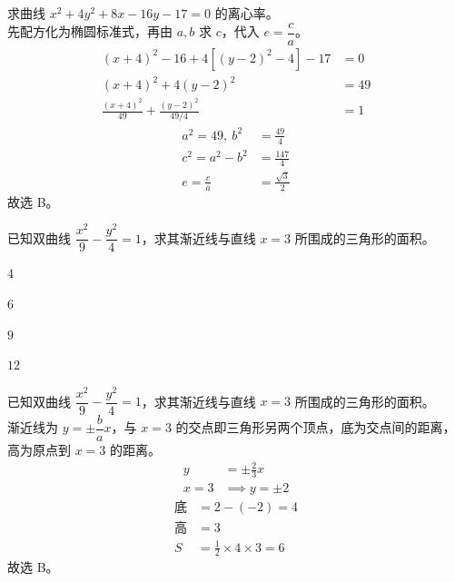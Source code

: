 \documentclass[12pt,a4paper]{exam-zh}
\begin{document}
\begin{solution}
    求曲线 $x^2+4y^2+8x-16y-17=0$ 的离心率。 \\
    先配方化为椭圆标准式，再由 $a,b$ 求 $c$，代入 $e=\dfrac{c}{a}$。 \\
    \begin{align*}
        (x+4)^2-16+4\left[(y-2)^2-4\right]-17 &= 0 \\
        (x+4)^2+4(y-2)^2 &= 49 \\
        \frac{(x+4)^2}{49}+\frac{(y-2)^2}{49/4} &= 1
    \end{align*}
    \begin{align*}
        a^2=49,\ b^2 &= \frac{49}{4} \\
        c^2 = a^2-b^2 &= \frac{147}{4} \\
        e=\frac{c}{a} &= \frac{\sqrt3}{2}
    \end{align*}
    故选 B。
\end{solution}



\begin{question}
    已知双曲线 $\dfrac{x^2}{9}-\dfrac{y^2}{4}=1$，求其渐近线与直线 $x=3$ 所围成的三角形的面积。 \paren[2]
    \begin{choices}
        \item $4$
        \item $6$
        \item $9$
        \item $12$
    \end{choices}
\end{question}

\begin{solution}
    已知双曲线 $\dfrac{x^2}{9}-\dfrac{y^2}{4}=1$，求其渐近线与直线 $x=3$ 所围成的三角形的面积。 \\
    渐近线为 $y=\pm\dfrac{b}{a}x$，与 $x=3$ 的交点即三角形另两个顶点，底为交点间的距离，高为原点到 $x=3$ 的距离。 \\
    \begin{align*}
        y &= \pm\frac{2}{3}x \\
        x=3 &\implies y=\pm2
    \end{align*}
    \begin{align*}
        \text{底} &= 2-(-2)=4 \\
        \text{高} &= 3 \\
        S &= \frac{1}{2}\times4\times3=6
    \end{align*}
    故选 B。
\end{solution}
\end{document}
